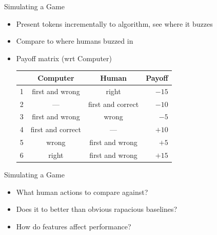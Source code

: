 \documentclass[compress]{beamer}
\begin{document}
\begin{frame}{Simulating a Game}
		\begin{itemize}
			\item Present tokens incrementally to algorithm, see where it buzzes
			\item Compare to where humans buzzed in
			\item Payoff matrix (wrt Computer)
			\begin{center}
\begin{tabular}{lccr}
& Computer & Human & Payoff \\
\hline
1 & first and wrong & right & $-15$ \\
2 & --- & first and correct & $-10$ \\
3  & first and wrong & wrong & $-5$ \\
4 & first and correct & --- & $+10$ \\
5 & wrong & first and wrong & $+5$ \\
6 & right & first and wrong & $+15$ \\
\hline
\end{tabular}
			\end{center}
		\end{itemize}
\end{frame}



\begin{frame}{Simulating a Game}

  \begin{itemize}
    \item What human actions to compare against?
     \item Does it to better than obvious rapacious baselines?
    \item How do features affect performance?
  \end{itemize}


\end{frame}
\end{document}
